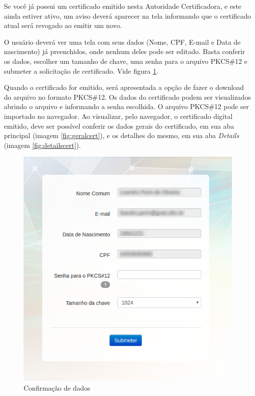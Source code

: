 Se você já possui um certificado emitido nesta Autoridade Certificadora, e este ainda estiver ativo, um aviso deverá aparecer na tela informando que o certificado atual será revogado ao emitir um novo.

O usuário deverá ver uma tela com seus dados (Nome, CPF, E-mail e Data de  nascimento) já preenchidos, onde nenhum deles pode ser editado. Basta conferir os dados, escolher um tamanho de chave, uma senha para o arquivo PKCS\#12 e submeter a solicitação de certificado. Vide figura \ref{fig:emissao3}.

Quando o certificado for emitido, será apresentada a opção de fazer o download do arquivo no formato PKCS\#12. Os dados do certificado podem ser visualizados abrindo o arquivo e informando a senha escolhida. O arquivo PKCS\#12 pode ser importado no navegador. Ao visualizar, pelo navegador, o certificado digital emitido, deve ser possível conferir os dados gerais do certificado, em sua aba principal (imagem \ref{fig:geralcert}), e os detalhes do mesmo, em sua aba \textit{Details} (imagem \ref{fig:detailscert}).

\begin{figure}[ht]
     \centering
     \includegraphics[scale=0.5]{images/firefox-solicitar-certificado.png}
     \caption{Confirmação de dados}
     \label{fig:emissao3}
\end{figure}

